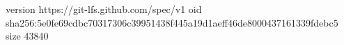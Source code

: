 version https://git-lfs.github.com/spec/v1
oid sha256:5e0fe69cdbc70317306c39951438f445a19d1aeff46de8000437161339fdebc5
size 43840
